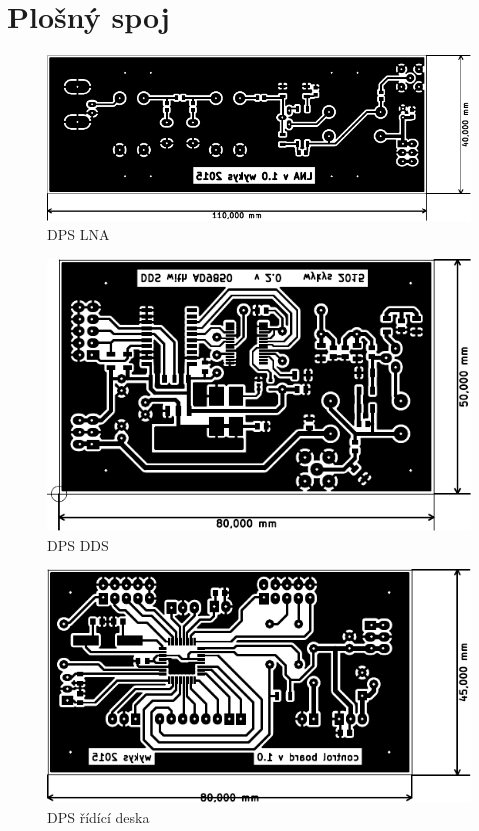 \section{Plošný spoj}
	\begin{figure}[H]
    	\centering
    	\includegraphics[width=160mm]{img/LNA-brd.pdf}
    	\caption{DPS LNA}    		
  	\end{figure}
  	
  	\begin{figure}[H]
    	\centering
    	\includegraphics[width=160mm]{img/DDS-brd.pdf}
    	\caption{DPS DDS}    		
  	\end{figure}
  	
  	\begin{figure}[H]
    	\centering
    	\includegraphics[width=160mm]{img/control_board-brd.pdf}
    	\caption{DPS řídící deska}    		
  	\end{figure}
  	
